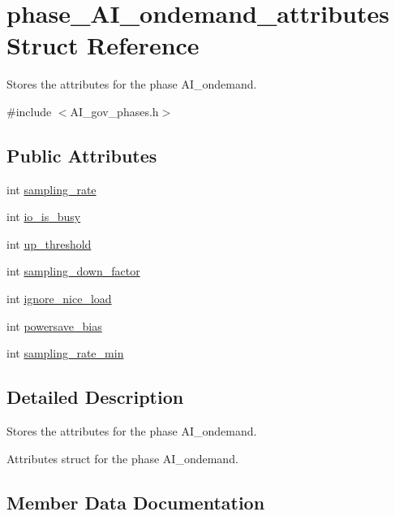 \hypertarget{structphase__AI__ondemand__attributes}{}\section{phase\+\_\+\+A\+I\+\_\+ondemand\+\_\+attributes Struct Reference}
\label{structphase__AI__ondemand__attributes}


Stores the attributes for the phase A\+I\+\_\+ondemand.  




{\ttfamily \#include $<$A\+I\+\_\+gov\+\_\+phases.\+h$>$}

\subsection*{Public Attributes}
\begin{DoxyCompactItemize}
\item 
int \hyperlink{structphase__AI__ondemand__attributes_a1d9322dcd59af390ae09c3ebfe494494}{sampling\+\_\+rate}
\item 
int \hyperlink{structphase__AI__ondemand__attributes_a3d65860451c443de080781e401d88ea8}{io\+\_\+is\+\_\+busy}
\item 
int \hyperlink{structphase__AI__ondemand__attributes_aee52fbd803958adf8a17febba143d643}{up\+\_\+threshold}
\item 
int \hyperlink{structphase__AI__ondemand__attributes_a0c68f95e0d62c70c14959ab1256ee9d5}{sampling\+\_\+down\+\_\+factor}
\item 
int \hyperlink{structphase__AI__ondemand__attributes_ab2b528d45d57b1f19c10cb116439fe02}{ignore\+\_\+nice\+\_\+load}
\item 
int \hyperlink{structphase__AI__ondemand__attributes_a1f59852545d558551e1731c0787436da}{powersave\+\_\+bias}
\item 
int \hyperlink{structphase__AI__ondemand__attributes_a8085ecab47a9480c26c642d19cc02b2c}{sampling\+\_\+rate\+\_\+min}
\end{DoxyCompactItemize}


\subsection{Detailed Description}
Stores the attributes for the phase A\+I\+\_\+ondemand. 

Attributes struct for the phase A\+I\+\_\+ondemand. 

\subsection{Member Data Documentation}
\mbox{\label{structphase__AI__ondemand__attributes_ab2b528d45d57b1f19c10cb116439fe02}} 
